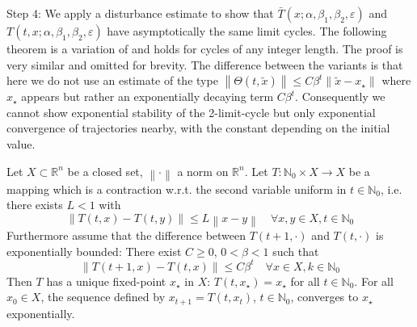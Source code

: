 \documentclass[runningheads]{llncs}
\def\xstar{x_\star}
\newcommand{\norm}[1]{\left\lVert#1\right\rVert}
\newcommand{\N}{\mathbb{N}} %
\newcommand{\R}{\mathbb{R}} %
\begin{document}
Step 4: 
We apply a disturbance estimate to show that $\bar T(x; \alpha, \beta_1, \beta_2, \varepsilon )$ and $ T(t, x; \alpha, \beta_1, \beta_2, \varepsilon)$ have asymptotically the same limit cycles. The following theorem is a variation of \cite[Theorem V.1.]{BockWeiss.2019} and holds for cycles of any integer length.
The proof is very similar and omitted for brevity. The difference between the
variants is that here we do not use an estimate of the type
 $\norm{\Theta(t,\tilde x)} \leq C \beta^t \norm {\tilde x-\xstar}$ where $\xstar$
appears but rather an exponentially decaying term $C \beta^t$. Consequently we cannot
show exponential stability of the 2-limit-cycle but only exponential convergence of
trajectories nearby, with the constant depending on the initial value.

\begin{theorem} 
Let $X\subset \R^n$ be a closed set, $\norm \cdot$ a norm on $\R^n$.
Let  $T : \N_0\times X \to X$ be a mapping which is a contraction w.r.t. the second variable
uniform in $t\in \N_0$, i.e. there exists $L<1$ with
\[
	\norm{T(t,x)-T(t,y)} \leq L \norm{x-y} \quad \forall x,y\in X , t\in\N_0
\]
Furthermore assume that the difference between $T(t+1,\cdot)$ and $T(t,\cdot)$ is 
exponentially bounded: There exist $C\geq 0$, $0<\beta<1$ such that
\[
	\norm{T(t+1,x)-T(t,x)} \leq C \beta^t \quad \forall x\in X , k\in\N_0
\]
Then $T$ has a unique fixed-point $\xstar$ in $X$: $T(t,\xstar) = \xstar$ for all 
$t \in\N_0$. 
For all $x_0 \in X$, the sequence defined by $x_{t+1} = T(t,x_t)$, $t\in\N_0$, 
converges to $\xstar$ exponentially.
\end{theorem}
\end{document}

